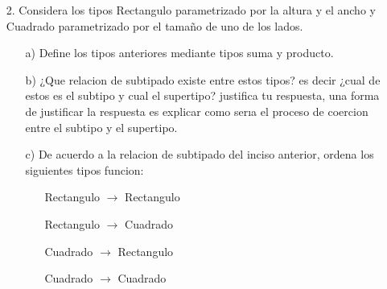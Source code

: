\documentclass{article}
\begin{document}
    \begin{itemize}
        \item[2.] Considera los tipos Rectangulo parametrizado por la altura y el ancho y Cuadrado parametrizado por el tamaño de uno de los lados.

        \begin{itemize}
            \item[a)] Define los tipos anteriores mediante tipos suma y producto.
            \item[b)] ¿Que relacion de subtipado existe entre estos tipos? es decir ¿cual de estos es el subtipo y cual el supertipo? justifica tu respuesta, una forma de justificar la respuesta es explicar como serıa el proceso de coercion entre el subtipo y el supertipo.
            \item[c)] De acuerdo a la relacion de subtipado del inciso anterior, ordena los siguientes tipos funcion:
            \begin{center}
                \begin{itemize}
                     \item[ ] Rectangulo $\rightarrow$ Rectangulo
                     \item[ ] Rectangulo $\rightarrow$ Cuadrado
                     \item[ ] Cuadrado $\rightarrow$ Rectangulo
                     \item[ ] Cuadrado $\rightarrow$ Cuadrado 
                 \end{itemize}
            \end{center} 
        \end{itemize}
    \end{itemize}
\end{document}
